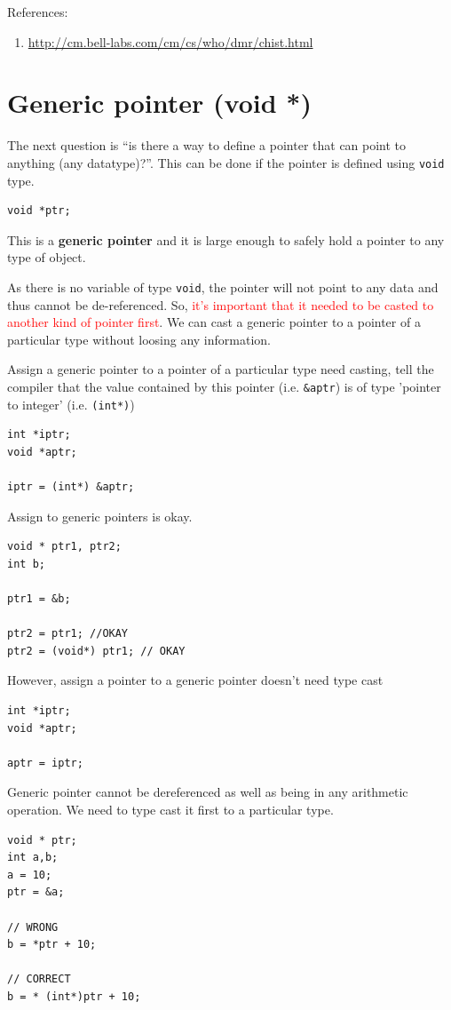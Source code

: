References:
\begin{enumerate}
  \item \url{http://cm.bell-labs.com/cm/cs/who/dmr/chist.html}
\end{enumerate}


\section{Generic pointer (void *)}
\label{sec:generic-pointer}

The next question is ``is there a way to define a pointer that can
point to anything (any datatype)?''. This can be done if the pointer
is defined using \verb!void! type. 
\begin{lstlisting}
void *ptr;
\end{lstlisting}
This is a {\bf generic pointer} and it is large enough to safely hold
a pointer to any type of object. 

As there is no variable of type \verb!void!, the pointer will not point to any
data and thus cannot be de-referenced. So, \textcolor{red}{it's important that
it needed to be casted to another kind of pointer first}. We can cast a generic
pointer to a pointer of a particular type without loosing any information.

Assign a generic pointer to a pointer of a particular type need
casting, tell the compiler that the value contained by this pointer
(i.e. \verb!&aptr!) is of type 'pointer to integer' (i.e. \verb!(int*)!) 
\begin{lstlisting}
int *iptr;
void *aptr;

iptr = (int*) &aptr;
\end{lstlisting}

Assign to generic pointers is okay.
\begin{verbatim}
void * ptr1, ptr2;
int b;

ptr1 = &b;

ptr2 = ptr1; //OKAY
ptr2 = (void*) ptr1; // OKAY
\end{verbatim}

However, assign a pointer to a generic pointer doesn't need type cast
\begin{lstlisting}
int *iptr;
void *aptr;

aptr = iptr;
\end{lstlisting}

\begin{framed}
Generic pointer cannot be dereferenced as well as being in any
arithmetic operation. We need to type cast it first to a particular
type. 
\begin{verbatim}
void * ptr;
int a,b;
a = 10;
ptr = &a;

// WRONG
b = *ptr + 10;

// CORRECT
b = * (int*)ptr + 10;
\end{verbatim}
\end{framed}



